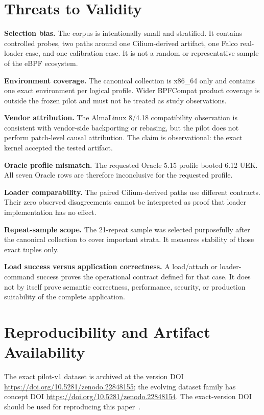 \documentclass[10pt]{article}
\begin{document}
\section{Threats to Validity}
\textbf{Selection bias.} The corpus is intentionally small and stratified. It contains controlled probes, two paths around one Cilium-derived artifact, one Falco real-loader case, and one calibration case. It is not a random or representative sample of the eBPF ecosystem.

\textbf{Environment coverage.} The canonical collection is x86\_64 only and contains one exact environment per logical profile. Wider BPFCompat product coverage is outside the frozen pilot and must not be treated as study observations.

\textbf{Vendor attribution.} The AlmaLinux 8/4.18 compatibility observation is consistent with vendor-side backporting or rebasing, but the pilot does not perform patch-level causal attribution. The claim is observational: the exact kernel accepted the tested artifact.

\textbf{Oracle profile mismatch.} The requested Oracle 5.15 profile booted 6.12 UEK. All seven Oracle rows are therefore inconclusive for the requested profile.

\textbf{Loader comparability.} The paired Cilium-derived paths use different contracts. Their zero observed disagreements cannot be interpreted as proof that loader implementation has no effect.

\textbf{Repeat-sample scope.} The 21-repeat sample was selected purposefully after the canonical collection to cover important strata. It measures stability of those exact tuples only.

\textbf{Load success versus application correctness.} A load/attach or loader-command success proves the operational contract defined for that case. It does not by itself prove semantic correctness, performance, security, or production suitability of the complete application.

\section{Reproducibility and Artifact Availability}
The exact pilot-v1 dataset is archived at the version DOI \url{https://doi.org/10.5281/zenodo.22848155}; the evolving dataset family has concept DOI \url{https://doi.org/10.5281/zenodo.22848154}. The exact-version DOI should be used for reproducing this paper~\cite{ari2026bpfcompat}.
\end{document}

